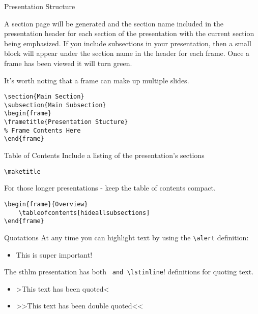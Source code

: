 \documentclass[compress]{beamer}
\begin{document}
\begin{frame}[containsverbatim]{Presentation Structure}

A section page will be generated and the section name included in the presentation header for each section of the presentation with the current section being emphasized.  If you include subsections in your presentation, then a small block will appear under the section name in the header for each frame.  Once a frame has been viewed it will turn green.

It's worth noting that a frame can make up multiple slides.

\begin{lstlisting}
\section{Main Section}
\subsection{Main Subsection}
\begin{frame}
\frametitle{Presentation Stucture}
% Frame Contents Here
\end{frame}
\end{lstlisting}
\end{frame}


\begin{frame}[containsverbatim]{Table of Contents}
Include a listing of the presentation's sections 
\begin{lstlisting}
\maketitle
\end{lstlisting}
For those longer presentations - keep the table of contents compact.
\begin{lstlisting}
\begin{frame}{Overview}
	\tableofcontents[hideallsubsections]
\end{frame}
\end{lstlisting}
\end{frame}


\begin{frame}[containsverbatim]{Quotations}
At any time you can highlight text by using the \lstinline!\alert! definition:
\begin{itemize}
	\item \alert{This is super important!}
\end{itemize}
The sthlm presentation has both \lstinline! and \lstinline!! definitions for quoting text.
\begin{itemize}
	\item[] >This text has been quoted<
	\item[] >>This text has been double quoted<<
\end{itemize}
\end{frame}
\end{document}
